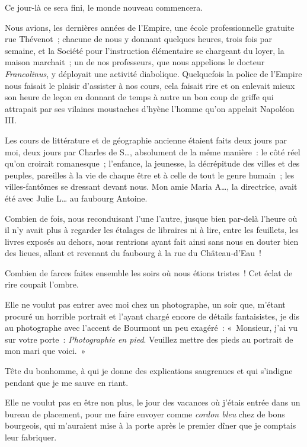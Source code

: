 \documentclass[french,twoside]{book} %
\begin{document}
Ce jour-là ce sera fini, le monde nouveau commencera.\par
Nous avions, les dernières années de l’Empire,  une école professionnelle gratuite rue Thévenot ; chacune de nous y donnant quelques heures, trois fois par semaine, et la Société pour l’instruction élémentaire se chargeant du loyer, la maison marchait ; un de nos professeurs, que nous appelions le docteur \emph{Francolinus}, y déployait une activité diabolique. Quelquefois la police de l’Empire nous faisait le plaisir d’assister à nos cours, cela faisait rire et on enlevait mieux son heure de leçon en donnant de temps à autre un bon coup de griffe qui attrapait par ses vilaines moustaches d’hyène l’homme qu’on appelait Napoléon III.\par
Les cours de littérature et de géographie ancienne étaient faits deux jours par moi, deux jours par Charles de S…, absolument de la même manière : le côté réel qu’on croirait romanesque ; l’enfance, la jeunesse, la décrépitude des villes et des peuples, pareilles à la vie de chaque être et à celle de tout le genre humain ; les villes-fantômes se dressant devant nous. Mon amie Maria A…, la directrice, avait été avec Julie L… au faubourg Antoine.\par
Combien de fois, nous reconduisant l’une l’autre, jusque bien par-delà l’heure où il n’y avait plus à regarder les étalages de libraires ni à lire, entre les feuillets, les livres exposés  au dehors, nous rentrions ayant fait ainsi sans nous en douter bien des lieues, allant et revenant du faubourg à la rue du Château-d’Eau !\par
Combien de farces faites ensemble les soirs où nous étions tristes ! Cet éclat de rire coupait l’ombre.\par
Elle ne voulut pas entrer avec moi chez un photographe, un soir que, m’étant procuré un horrible portrait et l’ayant chargé encore de détails fantaisistes, je dis au photographe avec l’accent de Bourmont un peu exagéré : « Monsieur, j’ai vu sur votre porte : \emph{Photographie en pied}. Veuillez mettre des pieds au portrait de mon mari que voici. »\par
Tête du bonhomme, à qui je donne des explications saugrenues et qui s’indigne pendant que je me sauve en riant.\par
Elle ne voulut pas en être non plus, le jour des vacances où j’étais entrée dans un bureau de placement, pour me faire envoyer comme \emph{cordon bleu} chez de bons bourgeois, qui m’auraient mise à la porte après le premier dîner que je comptais leur fabriquer.\par
\end{document}

